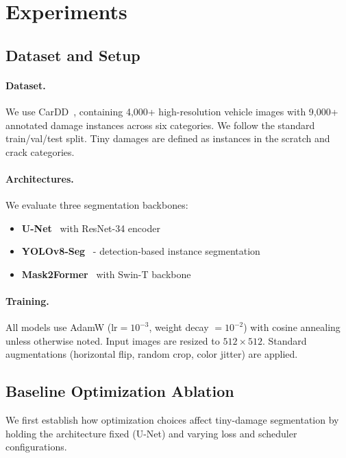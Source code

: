 \documentclass[10pt,twocolumn]{article}
\begin{document}
\section{Experiments}
\label{sec:experiments}

\subsection{Dataset and Setup}

\paragraph{Dataset.} We use CarDD~\cite{wang2023cardd}, containing 4,000+ high-resolution vehicle images with 9,000+ annotated damage instances across six categories. We follow the standard train/val/test split. Tiny damages are defined as instances in the scratch and crack categories.

\paragraph{Architectures.} We evaluate three segmentation backbones:
\begin{itemize}
    \item \textbf{U-Net}~\cite{ronneberger2015unet} with ResNet-34 encoder
    \item \textbf{YOLOv8-Seg}~\cite{jocher2023yolov8} - detection-based instance segmentation
    \item \textbf{Mask2Former}~\cite{cheng2022mask2former} with Swin-T backbone
\end{itemize}

\paragraph{Training.} All models use AdamW ($\text{lr}=10^{-3}$, weight decay $= 10^{-2}$) with cosine annealing unless otherwise noted. Input images are resized to $512 \times 512$. Standard augmentations (horizontal flip, random crop, color jitter) are applied.

\subsection{Baseline Optimization Ablation}
\label{sec:ablation}

We first establish how optimization choices affect tiny-damage segmentation by holding the architecture fixed (U-Net) and varying loss and scheduler configurations.
\end{document}
